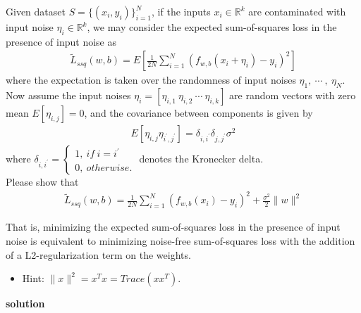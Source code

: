 \documentclass{article}
\begin{document}
Given dataset $S = \{(x_i, y_i)\}^N_{i = 1}$, if the inputs $x_i \in {\mathbb R}^k$ are contaminated with input noise $\eta_i \in {\mathbb R}^k$, we may consider the expected sum-of-squares loss in the presence of input noise as
\begin{align*}
    {\tilde L}_{ssq}(w, b) = E[\frac{1}{2N} \sum_{i = 1}^N (f_{w, b}(x_i + \eta_i) − y_i)^2]
\end{align*}
where the expectation is taken over the randomness of input noises $\eta_1,\ \cdots\ ,\ \eta_N$.\\

Now assume the input noises $\eta_i = [\eta_{i, 1}\ \eta_{i, 2}\ \cdots\ \eta_{i, k}]$ are random vectors with zero mean $E[\eta_{i, j}] = 0$, and the covariance between components is given by
\begin{align*}
    E[\eta_{i, j} \eta_{i^\prime, j^\prime}] = \delta_{i, i^\prime} \delta_{j, j^\prime} \sigma^2
\end{align*}
where $\delta_{i, i^\prime} =
\left\{
\begin{array}{l}
    1,\ if\ i = i^\prime\\
    0,\ otherwise.
\end{array}
\right.$ denotes the Kronecker delta.\\

Please show that
\begin{align*}
    {\tilde L}_{ssq}(w, b) = \frac{1}{2N} \sum_{i = 1}^N (f_{w, b}(x_i) − y_i)^2 + \frac{\sigma^2}{2} \| w \|^2
\end{align*}

That is, minimizing the expected sum-of-squares loss in the presence of input noise is equivalent to minimizing noise-free sum-of-squares loss with the addition of a L2-regularization term on the weights.

\begin{itemize}
    \item Hint: $\| x \|^2 = x^T x = Trace(x x^T)$.
\end{itemize}

\noindent
{\bf \large solution}\\
\end{document}
